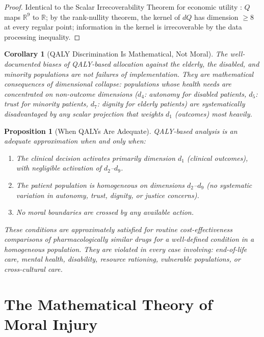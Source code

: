 \documentclass[12pt]{article}
\newtheorem{proposition}[theorem]{Proposition}
\newtheorem{corollary}[theorem]{Corollary}
\theoremstyle{definition}
\theoremstyle{remark}
\newcommand{\R}{\mathbb{R}}
\begin{document}
\begin{proof}
Identical to the Scalar Irrecoverability Theorem for economic utility \cite{bond2026geometric}: $Q$ maps $\R^9$ to $\R$; by the rank-nullity theorem, the kernel of $dQ$ has dimension $\geq 8$ at every regular point; information in the kernel is irrecoverable by the data processing inequality.
\end{proof}

\begin{corollary}[QALY Discrimination Is Mathematical, Not Moral]
\label{cor:qaly_discrimination}
The well-documented biases of QALY-based allocation against the elderly, the disabled, and minority populations \cite{harris1987,nord1999} are not failures of implementation.  They are mathematical consequences of dimensional collapse: populations whose health needs are concentrated on non-outcome dimensions ($d_4$: autonomy for disabled patients, $d_5$: trust for minority patients, $d_7$: dignity for elderly patients) are systematically disadvantaged by any scalar projection that weights $d_1$ (outcomes) most heavily.
\end{corollary}

\begin{proposition}[When QALYs Are Adequate]
\label{prop:qaly_adequate}
QALY-based analysis is an adequate approximation when and only when:
\begin{enumerate}
    \item The clinical decision activates primarily dimension $d_1$ (clinical outcomes), with negligible activation of $d_2$--$d_9$.
    \item The patient population is homogeneous on dimensions $d_2$--$d_9$ (no systematic variation in autonomy, trust, dignity, or justice concerns).
    \item No moral boundaries are crossed by any available action.
\end{enumerate}
These conditions are approximately satisfied for routine cost-effectiveness comparisons of pharmacologically similar drugs for a well-defined condition in a homogeneous population.  They are violated in every case involving: end-of-life care, mental health, disability, resource rationing, vulnerable populations, or cross-cultural care.
\end{proposition}


\section{The Mathematical Theory of Moral Injury}
\label{sec:moral_injury}
\end{document}
